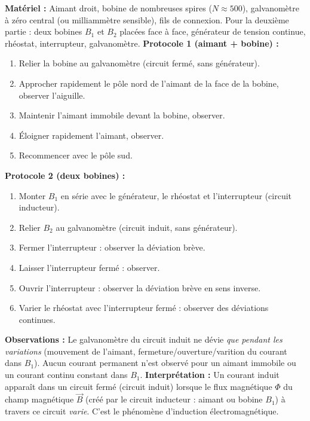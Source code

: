 \documentclass[11pt]{article}
\newcommand{\cle}[1]{{\popxbold\color{popdark}#1}}
\begin{document}
\begin{experience}
\textbf{Matériel :} Aimant droit, bobine de nombreuses spires ($N \approx 500$), galvanomètre à zéro central (ou milliammètre sensible), fils de connexion. Pour la deuxième partie : deux bobines $B_1$ et $B_2$ placées face à face, générateur de tension continue, rhéostat, interrupteur, galvanomètre.
\textbf{Protocole 1 (aimant + bobine) :}
\begin{enumerate}
\item Relier la bobine au galvanomètre (circuit fermé, sans générateur).
\item Approcher rapidement le pôle nord de l'aimant de la face de la bobine, observer l'aiguille.
\item Maintenir l'aimant immobile devant la bobine, observer.
\item Éloigner rapidement l'aimant, observer.
\item Recommencer avec le pôle sud.
\end{enumerate}
\textbf{Protocole 2 (deux bobines) :}
\begin{enumerate}
\item Monter $B_1$ en série avec le générateur, le rhéostat et l'interrupteur (circuit inducteur).
\item Relier $B_2$ au galvanomètre (circuit induit, sans générateur).
\item Fermer l'interrupteur : observer la déviation brève.
\item Laisser l'interrupteur fermé : observer.
\item Ouvrir l'interrupteur : observer la déviation brève en sens inverse.
\item Varier le rhéostat avec l'interrupteur fermé : observer des déviations continues.
\end{enumerate}
\textbf{Observations :} Le galvanomètre du circuit induit ne dévie \emph{que pendant les variations} (mouvement de l'aimant, fermeture/ouverture/varition du courant dans $B_1$). Aucun courant permanent n'est observé pour un aimant immobile ou un courant continu constant dans $B_1$.
\textbf{Interprétation :} Un \cle{courant induit} apparaît dans un circuit fermé (circuit induit) lorsque le \cle{flux magnétique} $\Phi$ du champ magnétique $\vec{B}$ (créé par le circuit inducteur : aimant ou bobine $B_1$) à travers ce circuit \emph{varie}. C'est le phénomène d'\cle{induction électromagnétique}.
\end{experience}
\end{document}
